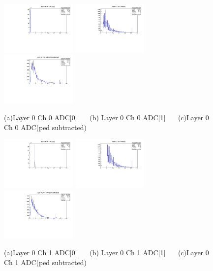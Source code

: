 \documentclass[a4paper,11pt]{article}
\theoremstyle{mytheor}
\begin{document}
\begin{figure}[H] 
\vspace*{-0.3cm} 
\includegraphics[width=0.33\textwidth,scale=0.5,trim=0 0 0 0,clip]{plotsdir/file0_test-Layer0_Ch0_adc0-1.pdf} 
\includegraphics[width=0.33\textwidth,scale=0.5,trim=0 0 0 0,clip]{plotsdir/file0_test-Layer0_Ch0_adc1-1.pdf} 
\includegraphics[width=0.33\textwidth,scale=0.5,trim=0 0 0 0,clip]{plotsdir/file0_test-Layer0_Ch0_adcPedsub-1.pdf} 
\caption{(a)Layer 0 Ch 0 ADC[0] ~~~(b) Layer 0 Ch 0 ADC[1] ~~~(c)Layer 0 Ch 0 ADC(ped subtracted) } 
\end{figure} 
\begin{figure}[H] 
\vspace*{-0.3cm} 
\includegraphics[width=0.33\textwidth,scale=0.5,trim=0 0 0 0,clip]{plotsdir/file0_test-Layer0_Ch1_adc0-1.pdf} 
\includegraphics[width=0.33\textwidth,scale=0.5,trim=0 0 0 0,clip]{plotsdir/file0_test-Layer0_Ch1_adc1-1.pdf} 
\includegraphics[width=0.33\textwidth,scale=0.5,trim=0 0 0 0,clip]{plotsdir/file0_test-Layer0_Ch1_adcPedsub-1.pdf} 
\caption{(a)Layer 0 Ch 1 ADC[0] ~~~(b) Layer 0 Ch 1 ADC[1] ~~~(c)Layer 0 Ch 1 ADC(ped subtracted) } 
\end{figure} 
\end{document}
